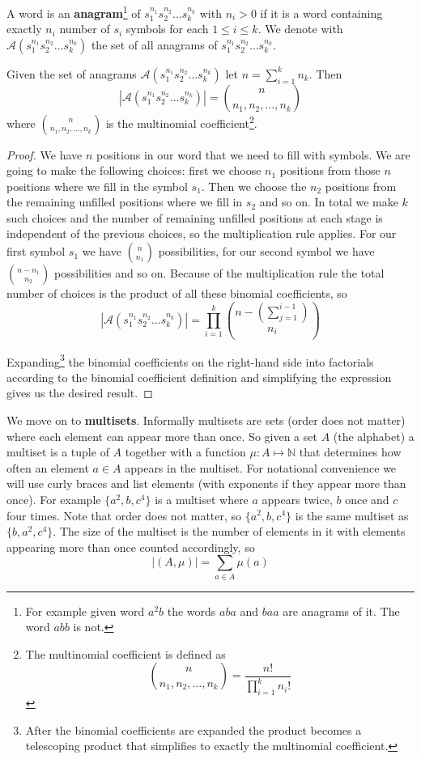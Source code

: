 \begin{defn}
A word is an \textbf{anagram}\footnote{For example given word $a^2b$ the words $aba$ and $baa$ are anagrams of it. The word $abb$ is not.} of $s_1^{n_1}s_2^{n_2} \ldots s_k^{n_k}$ with $n_i > 0$ if it is a word containing exactly $n_i$ number of $s_i$ symbols for each $1 \leq i \leq k$. We denote with $\mathcal{A}(s_1^{n_1}s_2^{n_2} \ldots s_k^{n_k})$ the set of all anagrams of $s_1^{n_1}s_2^{n_2} \ldots s_k^{n_k}$.
\end{defn}

\begin{thm}\label{num_anagrams}
Given the set of anagrams $\mathcal{A}(s_1^{n_1}s_2^{n_2} \ldots s_k^{n_k})$  let $n = \sum_{i = 1}^k n_k$. Then
$$
|\mathcal{A}(s_1^{n_1}s_2^{n_2} \ldots s_k^{n_k})| = \binom{n}{n_1,n_2, \ldots, n_k}
$$	
where $\binom{n}{n_1,n_2, \ldots, n_k}$ is the multinomial coefficient\footnote{The multinomial coefficient is defined as
$$
\binom{n}{n_1,n_2, \ldots, n_k} = \frac{n!}{\prod_{i = 1}^k n_i!}
$$}.
\end{thm}

\begin{proof}
We have $n$ positions in our word that we need to fill with symbols. We are going to make the following choices: first we choose $n_1$ positions from those $n$ positions where we fill in the symbol $s_1$. Then we choose the $n_2$ positions from the remaining unfilled positions where we fill in $s_2$ and so on. In total we make $k$ such choices and the number of remaining unfilled positions at each stage is independent of the previous choices, so the multiplication rule applies. For our first symbol $s_1$ we have $\binom{n}{n_1}$ possibilities, for our second symbol we have $\binom{n - n_1}{n_2}$ possibilities and so on. Because of the multiplication rule the total number of choices is the product of all these binomial coefficients, so
$$
|\mathcal{A}(s_1^{n_1}s_2^{n_2} \ldots s_k^{n_k})| = \prod_{i = 1}^k \binom{n - (\sum_{j = 1}^{i - 1})}{n_i}
$$

Expanding\footnote{After the binomial coefficients are expanded the product becomes a telescoping product that simplifies to exactly the multinomial coefficient.} the binomial coefficients on the right-hand side into factorials according to the binomial coefficient definition and simplifying the expression gives us the desired result.
\end{proof}

We move on to \textbf{multisets}. Informally multisets are sets (order does not matter) where each element can appear more than once. So given a set $A$ (the alphabet) a multiset is a tuple of $A$ together with a function $\mu: A \mapsto \mathbb{N}$ that determines how often an element $a \in A$ appears in the multiset. For notational convenience we will use curly braces and list elements (with exponents if they appear more than once). For example $\{a^2, b, c^4\}$ is a multiset where $a$ appears twice, $b$ once and $c$ four times. Note that order does not matter, so $\{a^2, b, c^4\}$ is the same multiset as $\{b, a^2, c^4\}$. The size of the multiset is the number of elements in it with elements appearing more than once counted accordingly, so 
$$
|(A, \mu)| = \sum_{a \in A} \mu(a)
$$

